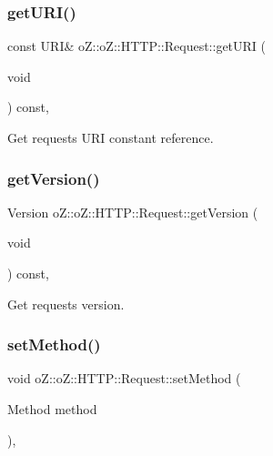 \subsubsection{\texorpdfstring{getURI()}{getURI()}\hspace{0.1cm}{\footnotesize\ttfamily [2/2]}}
{\footnotesize\ttfamily const U\+RI\& o\+Z\+::o\+Z\+::\+H\+T\+T\+P\+::\+Request\+::get\+U\+RI (\begin{DoxyParamCaption}\item[{void}]{ }\end{DoxyParamCaption}) const\hspace{0.3cm}{\ttfamily [inline]}, {\ttfamily [noexcept]}}



Get request\textquotesingle{}s U\+RI constant reference. 

\mbox{\label{classo_z_1_1o_z_1_1_h_t_t_p_1_1_request_ab7224cf669a39fe5385351728ce25797}} 
\subsubsection{\texorpdfstring{getVersion()}{getVersion()}}
{\footnotesize\ttfamily Version o\+Z\+::o\+Z\+::\+H\+T\+T\+P\+::\+Request\+::get\+Version (\begin{DoxyParamCaption}\item[{void}]{ }\end{DoxyParamCaption}) const\hspace{0.3cm}{\ttfamily [inline]}, {\ttfamily [noexcept]}}



Get request\textquotesingle{}s version. 

\mbox{\label{classo_z_1_1o_z_1_1_h_t_t_p_1_1_request_a5657aa20edabc241f3877f8937522e4a}} 
\subsubsection{\texorpdfstring{setMethod()}{setMethod()}}
{\footnotesize\ttfamily void o\+Z\+::o\+Z\+::\+H\+T\+T\+P\+::\+Request\+::set\+Method (\begin{DoxyParamCaption}\item[{Method}]{method }\end{DoxyParamCaption})\hspace{0.3cm}{\ttfamily [inline]}, {\ttfamily [noexcept]}}



